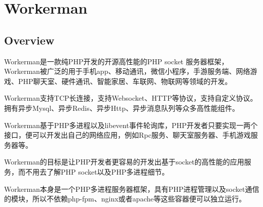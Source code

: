 \part{Workerman}


\chapter{Overview}


Workerman是一款纯PHP开发的开源高性能的PHP socket 服务器框架，Workerman被广泛的用于手机app、移动通讯，微信小程序，手游服务端、网络游戏、PHP聊天室、硬件通讯、智能家居、车联网、物联网等领域的开发。 

Workerman支持TCP长连接，支持Websocket、HTTP等协议，支持自定义协议。拥有异步Mysql、异步Redis、异步Http、异步消息队列等众多高性能组件。


Workerman基于PHP多进程以及libevent事件轮询库，PHP开发者只要实现一两个接口，便可以开发出自己的网络应用，例如Rpc服务、聊天室服务器、手机游戏服务器等。

Workerman的目标是让PHP开发者更容易的开发出基于socket的高性能的应用服务，而不用去了解PHP socket以及PHP多进程细节。

Workerman本身是一个PHP多进程服务器框架，具有PHP进程管理以及socket通信的模块，所以不依赖php-fpm、nginx或者apache等这些容器便可以独立运行。